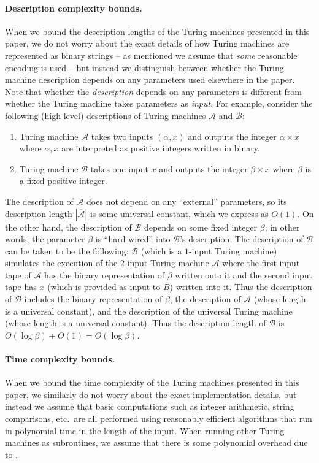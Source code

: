 \documentclass[11pt]{article}
\theoremstyle{definition}
\newcommand{\desc}[1]{\overline{\cal{#1}}}
\renewcommand{\cal}[1]{\mathcal{#1}}
\begin{document}
\paragraph{Description complexity bounds.} When we bound the description lengths of
the Turing machines presented in this paper, we do not worry about the exact
details of how Turing machines are represented as binary strings -- as mentioned we assume that
\emph{some} reasonable encoding is used -- but instead
we distinguish between whether the Turing machine 
description depends on any parameters used elsewhere in the paper. Note that whether the \emph{description} depends on any parameters is different from whether the Turing machine takes parameters as \emph{input}. For example, consider the following (high-level) descriptions of Turing machines $\cal{A}$ and $\cal{B}$:

\begin{enumerate}
	\item Turing machine $\cal{A}$ takes two inputs $(\alpha,x)$ and outputs the integer $\alpha \times x$ where $\alpha, x$ are interpreted as positive integers written in binary. 
	\item Turing machine $\cal{B}$ takes one input $x$ and outputs the integer $\beta \times x$ where $\beta$ is a fixed positive integer.
\end{enumerate}

The description of $\cal{A}$ does not depend on any ``external'' parameters, so its description length $|\desc{\cal{A}}|$ is some universal constant, which we express as $O(1)$. On the other hand, the description of $\cal{B}$ depends on some fixed integer $\beta$; in other words, the parameter $\beta$ is ``hard-wired'' into $\cal{B}$'s description. The description of $\cal{B}$ can be taken to be the following: $\cal{B}$ (which is a $1$-input Turing machine) simulates the execution of the $2$-input Turing machine $\cal{A}$ where the first input tape of $\cal{A}$ has the binary representation of $\beta$ written onto it and the second input tape has $x$ (which is provided as input to $B$) written into it. Thus the description of $\cal{B}$ includes the binary representation of $\beta$, the description of $\cal{A}$ (whose length is a universal constant), and the description of the universal Turing machine (whose length is a universal constant). Thus the description length of $\cal{B}$ is $O(\log \beta) + O(1) = O(\log \beta)$.



\paragraph{Time complexity bounds.} When we bound the time complexity of the Turing machines presented in this paper, we similarly do not worry about the exact
implementation details, but instead we assume that basic computations such as integer arithmetic, string comparisons, etc.\ are all performed
using reasonably efficient algorithms that run in polynomial time in the length of the input. When running other Turing machines as subroutines, we assume that there is some polynomial overhead due to .
\end{document}
